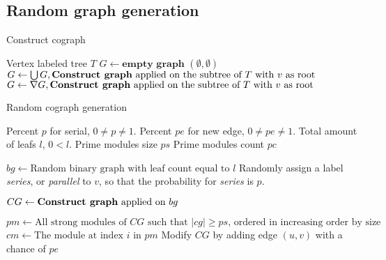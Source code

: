 \documentclass{amsart}
\begin{document}
\subsection{Random graph generation}

\begin{algorithm}[H]
    \caption{Construct cograph}
    \label{alg:modmin}
    \begin{algorithmic}[1]
        \REQUIRE Vertex labeled tree $T$
        \ENDIF
        \STATE $G \leftarrow \textbf{empty graph $(\emptyset,\emptyset)$}$
                \STATE $G \leftarrow \bigcup G, \text{\textbf{Construct graph} applied
                on the subtree of $T$ with $v$ as root} $
                \STATE $G \leftarrow \nabla G, \text{\textbf{Construct graph} applied
                on the subtree of $T$ with $v$ as root}$
            \ENDIF
        \ENDFOR
    \end{algorithmic}
\end{algorithm}

\begin{algorithm}[H]
    \caption{Random cograph generation}
  \label{alg:modmin}
  \begin{algorithmic}[1]
      \REQUIRE Percent $p$ for serial, $0 \neq p \neq 1$.
      \REQUIRE Percent $pe$ for new  edge, $0 \neq pe \neq 1$.
      \REQUIRE Total amount of leafs $l$, $0 < l$.
      \REQUIRE Prime modules size $ps$
      \REQUIRE Prime modules count $pc$

      \STATE $bg \leftarrow \text{Random binary graph with leaf count equal to $l$}$
        \STATE Randomly assign a label  \textit{series}, or \textit{parallel} to $v$, so
        that the probability for \textit{series} is $p$.
      \ENDFOR

      \STATE $CG \leftarrow \text{\textbf{Construct graph} applied on $bg$}$

      \STATE $pm \leftarrow \text{All strong modules of $CG$ such that $|cg| \geq ps$, ordered in increasing order by size}$
        \STATE $cm \leftarrow \text{The module at index $i$ in $pm$}$
            \STATE Modify $CG$ by adding edge $(u,v)$ with a chance of $pe$
        \ENDFOR
      \ENDFOR
  \end{algorithmic}
\end{algorithm}
\end{document}

